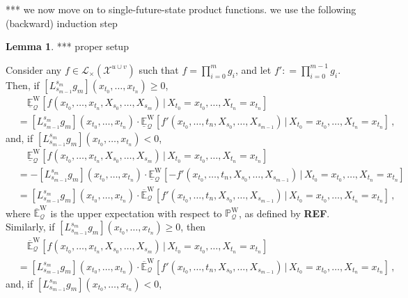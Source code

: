 \documentclass[10pt]{paper}
\theoremstyle{definition}
\newtheorem{lemma}[theorem]{Lemma}
\newcommand{\states}{\mathcal{X}}
\newcommand{\processes}{\mathbb{P}}
\newcommand{\wprocesses}{\processes^{\mathrm{W}}}
\newcommand{\gambles}{\mathcal{L}}
\newcommand{\rateset}{\mathcal{Q}}
\newcommand{\coloneqq}{:\!=}
\begin{document}
*** we now move on to single-future-state product functions. we use the following (backward) induction step

\begin{lemma}\label{lem:single_future_state_product_factorizes}
*** proper setup

Consider any $f\in\gambles_\times(\states^{u\cup v})$ such that $f=\prod_{i=0}^m g_i$, and let $f'\coloneqq \prod_{i=0}^{m-1} g_i$. Then, if $[L_{s_{m-1}}^{s_m}g_m](x_{t_0},\ldots,x_{t_n})\geq 0$,
\begin{align*}
&\quad \underline{\mathbb{E}}_\rateset^\mathrm{W}[f(x_{t_0},\ldots,x_{t_n},X_{s_0},\ldots,X_{s_m})\,\vert\,X_{t_0}=x_{t_0},\ldots,X_{t_n}=x_{t_n}] \\
 &= [L_{s_{m-1}}^{s_m}g_m](x_{t_0},\ldots,x_{t_n})\cdot\underline{\mathbb{E}}_\rateset^\mathrm{W}\left[ f'(x_{t_0},\ldots,t_n,X_{s_0},\ldots,X_{s_{m-1}})\,\Big\vert\,X_{t_0}=x_{t_0},\ldots,X_{t_n}=x_{t_n}\right]\,,
\end{align*}
and, if $[L_{s_{m-1}}^{s_m}g_m](x_{t_0},\ldots,x_{t_n})<0$, 
\begin{align*}
&\quad \underline{\mathbb{E}}_\rateset^\mathrm{W}[f(x_{t_0},\ldots,x_{t_n},X_{s_0},\ldots,X_{s_m})\,\vert\,X_{t_0}=x_{t_0},\ldots,X_{t_n}=x_{t_n}] \\
 &= -[L_{s_{m-1}}^{s_m}g_m](x_{t_0},\ldots,x_{t_n})\cdot\underline{\mathbb{E}}_\rateset^\mathrm{W}\left[ -f'(x_{t_0},\ldots,t_n,X_{s_0},\ldots,X_{s_{m-1}})\,\Big\vert\,X_{t_0}=x_{t_0},\ldots,X_{t_n}=x_{t_n}\right] \\
 &= [L_{s_{m-1}}^{s_m}g_m](x_{t_0},\ldots,x_{t_n})\cdot\overline{\mathbb{E}}_\rateset^\mathrm{W}\left[f'(x_{t_0},\ldots,t_n,X_{s_0},\ldots,X_{s_{m-1}})\,\Big\vert\,X_{t_0}=x_{t_0},\ldots,X_{t_n}=x_{t_n}\right] \,,
\end{align*}
where $\overline{\mathbb{E}}_\rateset^\mathrm{W}$ is the upper expectation with respect to $\wprocesses_\rateset$, as defined by {\bf REF}. Similarly, if $[L_{s_{m-1}}^{s_m}g_m](x_{t_0},\ldots,x_{t_n})\geq 0$, then
\begin{align*}
&\quad \overline{\mathbb{E}}_\rateset^\mathrm{W}[f(x_{t_0},\ldots,x_{t_n},X_{s_0},\ldots,X_{s_m})\,\vert\,X_{t_0}=x_{t_0},\ldots,X_{t_n}=x_{t_n}] \\
 &= [L_{s_{m-1}}^{s_m}g_m](x_{t_0},\ldots,x_{t_n})\cdot\overline{\mathbb{E}}_\rateset^\mathrm{W}\left[ f'(x_{t_0},\ldots,t_n,X_{s_0},\ldots,X_{s_{m-1}})\,\Big\vert\,X_{t_0}=x_{t_0},\ldots,X_{t_n}=x_{t_n}\right]\,,
\end{align*}
and, if $[L_{s_{m-1}}^{s_m}g_m](x_{t_0},\ldots,x_{t_n})<0$, 

\end{lemma}
\end{document}
